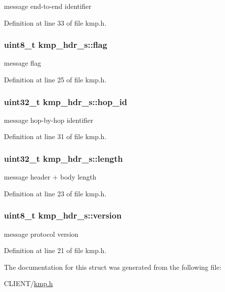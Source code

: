 message end-\/to-\/end identifier 



Definition at line 33 of file kmp.\-h.

\hypertarget{structkmp__hdr__s_a9fb7d6b15240a2819ecf1bb5f8a9188f}{
\subsubsection[{flag}]{\setlength{\rightskip}{0pt plus 5cm}uint8\-\_\-t kmp\-\_\-hdr\-\_\-s\-::flag}}\label{structkmp__hdr__s_a9fb7d6b15240a2819ecf1bb5f8a9188f}


message flag 



Definition at line 25 of file kmp.\-h.

\hypertarget{structkmp__hdr__s_a0b3186d9e096e3e599a0a96329ccc091}{
\subsubsection[{hop\-\_\-id}]{\setlength{\rightskip}{0pt plus 5cm}uint32\-\_\-t kmp\-\_\-hdr\-\_\-s\-::hop\-\_\-id}}\label{structkmp__hdr__s_a0b3186d9e096e3e599a0a96329ccc091}


message hop-\/by-\/hop identifier 



Definition at line 31 of file kmp.\-h.

\hypertarget{structkmp__hdr__s_a2c434e6d127228ecf717e5a89ceb385f}{
\subsubsection[{length}]{\setlength{\rightskip}{0pt plus 5cm}uint32\-\_\-t kmp\-\_\-hdr\-\_\-s\-::length}}\label{structkmp__hdr__s_a2c434e6d127228ecf717e5a89ceb385f}


message header + body length 



Definition at line 23 of file kmp.\-h.

\hypertarget{structkmp__hdr__s_a776ad75facaebe9caa19d9d08295d2a9}{
\subsubsection[{version}]{\setlength{\rightskip}{0pt plus 5cm}uint8\-\_\-t kmp\-\_\-hdr\-\_\-s\-::version}}\label{structkmp__hdr__s_a776ad75facaebe9caa19d9d08295d2a9}


message protocol version 



Definition at line 21 of file kmp.\-h.



The documentation for this struct was generated from the following file\-:\begin{DoxyCompactItemize}
\item 
C\-L\-I\-E\-N\-T/\hyperlink{kmp_8h}{kmp.\-h}\end{DoxyCompactItemize}

